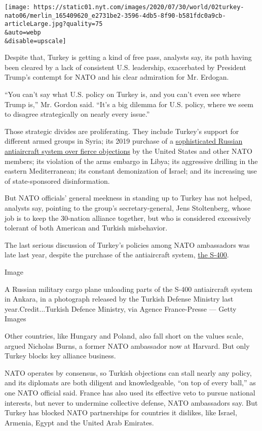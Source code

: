\texttt{[image: https://static01.nyt.com/images/2020/07/30/world/02turkey-nato06/merlin\_165409620\_e2731be2-3596-4db5-8f90-b581fdc0a9cb-articleLarge.jpg?quality=75\\\&auto=webp\\\&disable=upscale]}

Despite that, Turkey is getting a kind of free pass, analysts say, its
path having been cleared by a lack of consistent U.S. leadership,
exacerbated by President Trump's contempt for NATO and his clear
admiration for Mr. Erdogan.

``You can't say what U.S. policy on Turkey is, and you can't even see
where Trump is,'' Mr. Gordon said. ``It's a big dilemma for U.S. policy,
where we seem to disagree strategically on nearly every issue.''

Those strategic divides are proliferating. They include Turkey's support
for different armed groups in Syria; its 2019 purchase of a
\href{https://www.nytimes.com/2019/07/12/world/europe/turkey-russia-missiles.html?searchResultPosition=1}{sophisticated
Russian antiaircraft system over fierce objections} by the United States
and other NATO members; its violation of the arms embargo in Libya; its
aggressive drilling in the eastern Mediterranean; its constant
demonization of Israel; and its increasing use of state-sponsored
disinformation.

But NATO officials' general meekness in standing up to Turkey has not
helped, analysts say, pointing to the group's secretary-general, Jens
Stoltenberg, whose job is to keep the 30-nation alliance together, but
who is considered excessively tolerant of both American and Turkish
misbehavior.

The last serious discussion of Turkey's policies among NATO ambassadors
was late last year, despite the purchase of the antiaircraft system,
\href{https://www.nytimes.com/2019/07/12/world/russia-turkey-missile-explain.html?searchResultPosition=1}{the
S-400}.

Image

A Russian military cargo plane unloading parts of the S-400 antiaircraft
system in Ankara, in a photograph released by the Turkish Defense
Ministry last year.Credit...Turkish Defence Ministry, via Agence
France-Presse --- Getty Images

Other countries, like Hungary and Poland, also fall short on the values
scale, argued Nicholas Burns, a former NATO ambassador now at Harvard.
But only Turkey blocks key alliance business.

NATO operates by consensus, so Turkish objections can stall nearly any
policy, and its diplomats are both diligent and knowledgeable, ``on top
of every ball,'' as one NATO official said. France has also used its
effective veto to pursue national interests, but never to undermine
collective defense, NATO ambassadors say. But Turkey has blocked NATO
partnerships for countries it dislikes, like Israel, Armenia, Egypt and
the United Arab Emirates.

